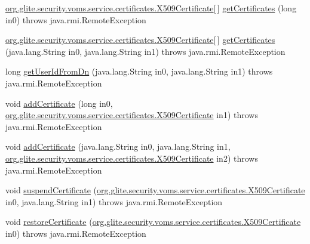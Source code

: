 \begin{DoxyCompactItemize}
\item 
\hyperlink{classorg_1_1glite_1_1security_1_1voms_1_1service_1_1certificates_1_1X509Certificate}{org.glite.security.voms.service.certificates.X509Certificate}\mbox{[}$\,$\mbox{]} \hyperlink{interfaceorg_1_1glite_1_1security_1_1voms_1_1service_1_1certificates_1_1VOMSCertificates_a53fb5a4b8f86c1b0a4c63e9e033dd071}{getCertificates} (long in0)  throws java.rmi.RemoteException
\item 
\hyperlink{classorg_1_1glite_1_1security_1_1voms_1_1service_1_1certificates_1_1X509Certificate}{org.glite.security.voms.service.certificates.X509Certificate}\mbox{[}$\,$\mbox{]} \hyperlink{interfaceorg_1_1glite_1_1security_1_1voms_1_1service_1_1certificates_1_1VOMSCertificates_a043ddef1543bc48c39a8cd7efa2a48ed}{getCertificates} (java.lang.String in0, java.lang.String in1)  throws java.rmi.RemoteException
\item 
long \hyperlink{interfaceorg_1_1glite_1_1security_1_1voms_1_1service_1_1certificates_1_1VOMSCertificates_a2880bef5d97529992378418fc0b04b9d}{getUserIdFromDn} (java.lang.String in0, java.lang.String in1)  throws java.rmi.RemoteException
\item 
void \hyperlink{interfaceorg_1_1glite_1_1security_1_1voms_1_1service_1_1certificates_1_1VOMSCertificates_a48bc3e355dd9497781967a142139a841}{addCertificate} (long in0, \hyperlink{classorg_1_1glite_1_1security_1_1voms_1_1service_1_1certificates_1_1X509Certificate}{org.glite.security.voms.service.certificates.X509Certificate} in1)  throws java.rmi.RemoteException
\item 
void \hyperlink{interfaceorg_1_1glite_1_1security_1_1voms_1_1service_1_1certificates_1_1VOMSCertificates_a47bd6d56a9d958167a3d5e69f3229544}{addCertificate} (java.lang.String in0, java.lang.String in1, \hyperlink{classorg_1_1glite_1_1security_1_1voms_1_1service_1_1certificates_1_1X509Certificate}{org.glite.security.voms.service.certificates.X509Certificate} in2)  throws java.rmi.RemoteException
\item 
void \hyperlink{interfaceorg_1_1glite_1_1security_1_1voms_1_1service_1_1certificates_1_1VOMSCertificates_ab66e25381a49f5f2210fe7ab4fa9a964}{suspendCertificate} (\hyperlink{classorg_1_1glite_1_1security_1_1voms_1_1service_1_1certificates_1_1X509Certificate}{org.glite.security.voms.service.certificates.X509Certificate} in0, java.lang.String in1)  throws java.rmi.RemoteException
\item 
void \hyperlink{interfaceorg_1_1glite_1_1security_1_1voms_1_1service_1_1certificates_1_1VOMSCertificates_aca71c4651eab46e31bee191eb8854bc3}{restoreCertificate} (\hyperlink{classorg_1_1glite_1_1security_1_1voms_1_1service_1_1certificates_1_1X509Certificate}{org.glite.security.voms.service.certificates.X509Certificate} in0)  throws java.rmi.RemoteException

\end{DoxyCompactItemize}
